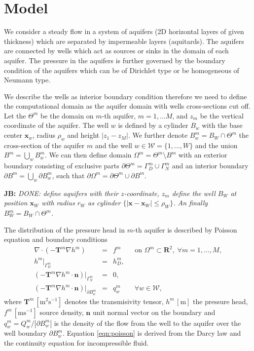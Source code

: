 \documentclass[preprint,12pt]{elsarticle}
\def\vc#1{\mathbf{\boldsymbol{#1}}}     %
\def\abs#1{\left|#1\right|}
\def\abs#1{| #1 |}
\newcommand{\R}{\mathbf{R}}
\newcommand{\noteJB}[1]{{\color{Blue} \textbf{JB: } \textit{#1}}}
\begin{document}
\section{Model}
\label{sec:model}
We consider a steady flow in a system of aquifers (2D horizontal layers of given thickness) which are separated by 
impermeable layers (aquitards). The aquifers are connected by wells which act as sources
or sinks in the domain of each aquifer. The pressure in the aquifers is further governed by the boundary 
condition of the aquifers which can be of Dirichlet type or be homogeneous of Neumann type.

We describe the wells as interior boundary condition therefore we need to define the computational domain
as the aquifer domain with wells cross-sections cut off. Let the $\Theta^m$ be the domain on $m$-th aquifer,
$m=1,\ldots M$, and $z_m$ be the vertical coordinate of the aquifer. The well $w$ is defined by a cylinder $B_w$
with the base center $\vc{x}_w$, radius $\rho_w$ and height $|z_1-z_M|$.  We further denote 
$B^m_w = B_W \cap \Theta^m$ the cross-section of the aquifer $m$ and the well $w\in\mathcal{W}=\{1,\ldots,W\}$
and the union $B^m=\bigcup\limits_{w}B^m_w$. 
We can then define domain $\Omega^m = \Theta^m\setminus B^m$ with an exterior boundary 
consisting of exclusive parts $\partial\Theta^m=\Gamma^m_D\cup\Gamma^m_N$ and an interior boundary 
$\partial B^m=\bigcup\limits_{w}\partial B^m_w$, 
such that $\partial\Omega^m=\partial\Theta^m\cup\partial B^m$.

\noteJB{DONE: define aquifers with their $z$-coordinate, $z_m$
define the well $B_W$ at position $\vc x_W$ with radius $r_W$ as cylinder $\{\abs{\vc x - \vc x_W} \le \rho_W\}$.
An finally $B_W^m = B_W \cap \Theta^m$.}

The distribution of the pressure head in $m$-th aquifer is described by Poisson equation and 
boundary conditions
\begin{eqnarray} \label{eqn:poisson}
\nabla\cdot(-\mathbf{T}^m\nabla h^m) &=& f^m \qquad \textrm{on } \Omega^m\subset\R^2,\; \forall m=1,\dots,M, \\
h^m|_{\Gamma^m_D} &=& h^m_D, \\
\left(-\mathbf{T}^m\nabla h^m\cdot\vc{n}\right)|_{\Gamma^m_N} &=& 0, \\
\left(-\mathbf{T}^m\nabla h^m\cdot\vc{n}\right)|_{\partial B^m_w} &=& q^m_w \qquad \forall w\in\mathcal{W},
\end{eqnarray}
where $\mathbf{T}^m\, [\textrm{m}^2\textrm{s}^{-1}]$ denotes the transmisivity tensor,
$h^m\, [\textrm{m}]$ the pressure head, $f^m\, [\textrm{m}\textrm{s}^{-1}]$ source density,
$\vc{n}$ unit normal vector on the boundary and
$q^m_w = Q^m_w/|\partial B^m_w|$ is the density of the flow from the well to the aquifer over the well boundary 
$\partial B^m_w$. Equation \eqref{eqn:poisson} is derived from the Darcy law and the continuity equation 
for incompressible fluid.
\end{document}

